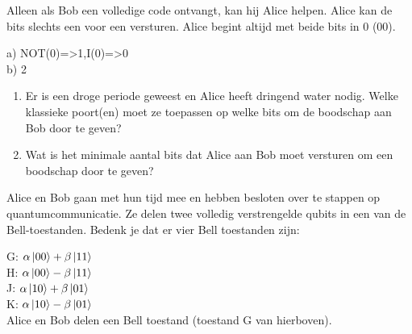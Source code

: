 \documentclass[../../main.tex]{subfiles}
\begin{document}
Alleen als Bob een volledige code ontvangt, kan hij Alice helpen. Alice kan de bits slechts een voor een versturen. Alice begint altijd met beide bits in 0 (00). 
\begin{antwoord}
a) NOT(0)=>1,I(0)=>0\\
b) 2
\end{antwoord}
\begin{enumerate}
\item Er is een droge periode geweest en Alice heeft dringend water nodig. Welke klassieke poort(en) moet ze toepassen op welke bits om de boodschap aan Bob door te geven? 
\item Wat is het minimale aantal bits dat Alice aan Bob moet versturen om een boodschap door te geven?
\end{enumerate}
Alice en Bob gaan met hun tijd mee en hebben besloten over te stappen op quantumcommunicatie. Ze delen twee volledig verstrengelde qubits in een van de Bell-toestanden. Bedenk je dat er vier Bell toestanden zijn:

G: $\alpha\ket{00}+\beta\ket{11}$\\
H: $\alpha\ket{00}-\beta\ket{11}$\\
J: $\alpha\ket{10}+\beta\ket{01}$\\
K: $\alpha\ket{10}-\beta\ket{01}$\\
Alice en Bob delen een Bell toestand (toestand G van hierboven). 
\end{document}

